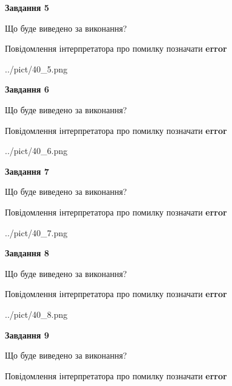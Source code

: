 \documentclass[11pt, ukrainian]{article}
\begin{document}
{\begin {large}
{\begin {center}\textbf{Завдання 5}\end {center}}\par
Що буде виведено за виконання? \par
Повідомлення інтерпретатора про помилку позначати \textbf{error}

\begin{center}
	{../pict/40_5.png}
\end{center}
\newpage

{\begin {center}\textbf{Завдання 6}\end {center}}\par
Що буде виведено за виконання? \par
Повідомлення інтерпретатора про помилку позначати \textbf{error}

\begin{center}
	{../pict/40_6.png}
\end{center}
\newpage

{\begin {center}\textbf{Завдання 7}\end {center}}\par
Що буде виведено за виконання? \par
Повідомлення інтерпретатора про помилку позначати \textbf{error}

\begin{center}
	{../pict/40_7.png}
\end{center}
\newpage

{\begin {center}\textbf{Завдання 8}\end {center}}\par
Що буде виведено за виконання? \par
Повідомлення інтерпретатора про помилку позначати \textbf{error}

\begin{center}
	{../pict/40_8.png}
\end{center}
\newpage

{\begin {center}\textbf{Завдання 9}\end {center}}\par
Що буде виведено за виконання? \par
Повідомлення інтерпретатора про помилку позначати \textbf{error}


\end{large}}
\end{document}
